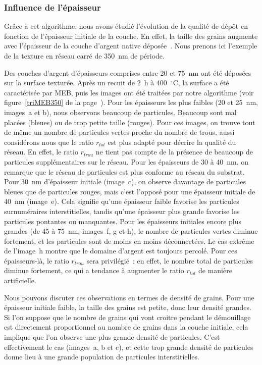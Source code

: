 	\subsubsection{Influence de l'épaisseur}
Grâce à cet algorithme, nous avons étudié l'évolution de la qualité de dépôt en fonction de l'épaisseur initiale de la couche. En effet, la taille des grains augmente avec l'épaisseur de la couche d'argent native déposée~\cite{hillert1965theory, thompson1990grain}. Nous prenons ici l'exemple de la texture en réseau carré de 350~nm de période.\par 
Des couches d'argent d'épaisseurs comprises entre 20 et 75~nm ont été déposées sur la surface texturée. Après un recuit de 2~h à 400~$^\circ$C, la surface a été caractérisée par MEB, puis les images ont été traitées par notre algorithme (voir figure~\ref{triMEB350} de la page~\pageref{triMEB350}). Pour les épaisseurs les plus faibles (20 et 25~nm, images~a et b), nous observons beaucoup de particules. Beaucoup sont mal placées (bleues) ou de trop petite taille (rouges). Pour ces images, on trouve tout de même un nombre de particules vertes proche du nombre de trous, aussi considérons nous que le ratio $r_{tot}$ est plus adapté pour décrire la qualité du réseau. En effet, le ratio $r_{trou}$ ne tient pas compte de la présence de beaucoup de particules supplémentaires sur le réseau. Pour les épaisseurs de 30 à 40~nm, on remarque que le réseau de particules est plus conforme au réseau du substrat. Pour 30~nm d'épaisseur initiale (image~c), on observe davantage de particules bleues que de particules rouges, mais c'est l'opposé pour une épaisseur initiale de 40~nm (image~e). Cela signifie qu'une épaisseur faible favorise les particules surnuméraires interstitielles, tandis qu'une épaisseur plus grande favorise les particules pontantes ou manquantes. Pour les épaisseurs initiales encore plus grandes (de 45 à 75~nm, images~f, g et h), le nombre de particules vertes diminue fortement, et les particules sont de moins en moins déconnectées. Le cas extrême de l'image~h montre que le domaine d'argent est toujours percolé. Pour ces épaisseurs-là, le ratio $r_{trou}$ sera privilégié~: en effet, le nombre total de particules diminue fortement, ce qui a tendance à augmenter le ratio $r_{tot}$ de manière artificielle.\par 
Nous pouvons discuter ces observations en termes de densité de grains. Pour une épaisseur initiale faible, la taille des grains est petite, donc leur densité grandes. Si l'on suppose que le nombre de grains qui vont croitre pendant le démouillage est directement proportionnel au nombre de grains dans la couche initiale, cela implique que l'on observe une plus grande densité de particules. C'est effectivement le cas (images~a, b et c), et cette trop grande densité de particules donne lieu à une grande population de particules interstitielles.\par 

